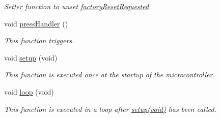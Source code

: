 \begin{DoxyCompactItemize}
\begin{DoxyCompactList}\small\item\em Setter function to unset \hyperlink{WIFIOnOff_8ino_a4768e99cded5c5493ba789b0555c80fc}{factory\-Reset\-Requested}. \end{DoxyCompactList}\item 
void \hyperlink{WIFIOnOff_8ino_acd4d58af93c899ee9a03131727b1cf34}{press\-Handler} ()
\begin{DoxyCompactList}\small\item\em This function triggers. \end{DoxyCompactList}\item 
void \hyperlink{WIFIOnOff_8ino_a7dfd9b79bc5a37d7df40207afbc5431f}{setup} (void)
\begin{DoxyCompactList}\small\item\em This function is executed once at the startup of the microcontroller. \end{DoxyCompactList}\item 
void \hyperlink{WIFIOnOff_8ino_a0b33edabd7f1c4e4a0bf32c67269be2f}{loop} (void)
\begin{DoxyCompactList}\small\item\em This function is executed in a loop after \hyperlink{WIFIOnOff_8ino_a7dfd9b79bc5a37d7df40207afbc5431f}{setup(void)} has been called. \end{DoxyCompactList}\end{DoxyCompactItemize}
